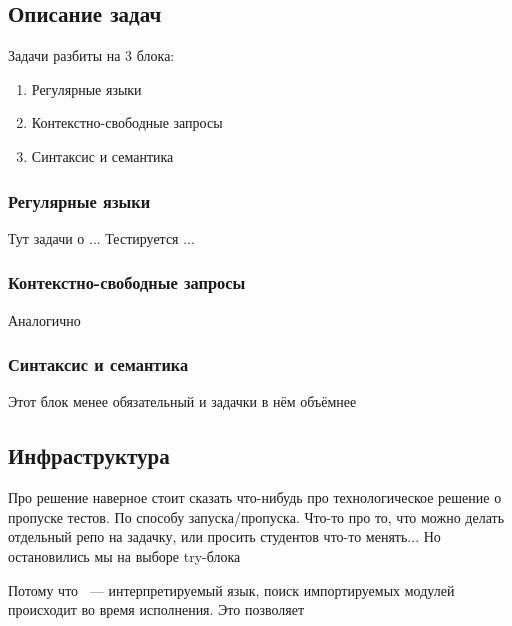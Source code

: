 \subsection{Описание задач}
Задачи разбиты на 3 блока:
\begin{enumerate}
    \item Регулярные языки
    \item Контекстно-свободные запросы
    \item Синтаксис и семантика
\end{enumerate}

\subsubsection{Регулярные языки}
Тут задачи о ...
Тестируется ...

\subsubsection{Контекстно-свободные запросы}
Аналогично

\subsubsection{Синтаксис и семантика}
Этот блок менее обязательный и задачки в нём объёмнее

\subsection{Инфраструктура}

{\scriptsize
    Про решение наверное стоит сказать что-нибудь про технологическое решение о пропуске тестов.
    По способу запуска/пропуска. Что-то про то, что можно делать отдельный репо на задачку, или просить студентов что-то менять... Но остановились мы на выборе try-блока }

Потому что \python{}~--- интерпретируемый язык, поиск импортируемых модулей происходит во время исполнения.
Это позволяет
